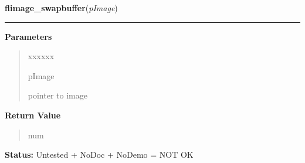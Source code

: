 \hspace{.8\funcindent}\begin{boxedminipage}{\funcwidth}

    \raggedright \textbf{flimage\_swapbuffer}(\textit{pImage})

    \vspace{-1.5ex}

    \rule{\textwidth}{0.5\fboxrule}
\setlength{\parskip}{2ex}
\setlength{\parskip}{1ex}
      \textbf{Parameters}
      \vspace{-1ex}

      \begin{quote}
        \begin{Ventry}{xxxxxx}

          \item[pImage]

          pointer to image

        \end{Ventry}

      \end{quote}

      \textbf{Return Value}
    \vspace{-1ex}

      \begin{quote}
      num

      \end{quote}

\textbf{Status:} Untested + NoDoc + NoDemo = NOT OK



    \end{boxedminipage}

    \label{xformslib:library:flimage_to_ximage}

    \vspace{0.5ex}

